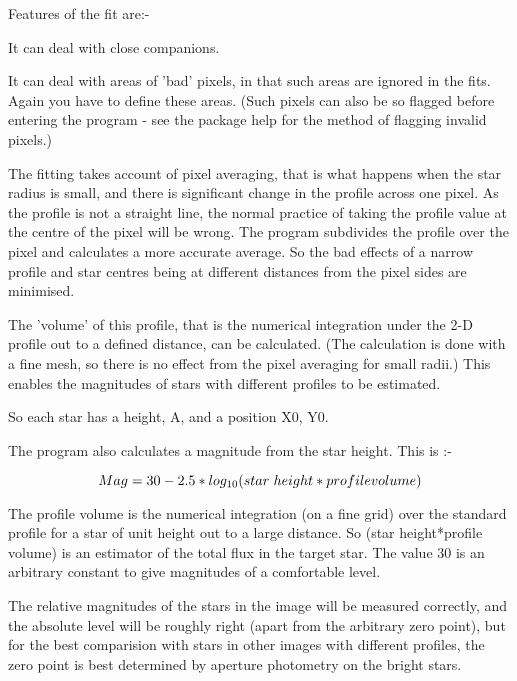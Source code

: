\begin{small}
{{ Features of the fit are:-

\begin{list}{{-}}{}
\item It can deal with close companions.
\item It can deal with areas of 'bad' pixels, in that such areas are
     ignored in the fits. Again you have to define these areas. (Such
     pixels can also be so flagged before entering the program - see
     the \starman package help for the method of flagging invalid
     pixels.)
\end{list}

  The fitting takes account of pixel averaging, that is what happens
  when the star radius is small, and there is significant change in
  the profile across one pixel. As the profile is not a straight line,
  the normal practice of taking the profile value at the centre of the
  pixel will be wrong. The program subdivides the profile over the
  pixel and calculates a more accurate average. So the bad effects of
  a narrow profile and star centres being at different distances from
  the pixel sides are minimised.

  The 'volume' of this profile, that is the numerical integration under
  the 2-D profile out to a defined distance, can be calculated. (The
  calculation is done with a fine mesh, so there is no effect from the
  pixel averaging for small radii.) This enables the magnitudes of
  stars with different profiles to be estimated.


   So each star has a height, A, and a position X0, Y0.


   The program also calculates a magnitude from the star height. This
   is :-

$$   Mag  =  30  -  2.5*log_{10}(star{\hspace{0.3em}}height*profile volume) $$

   The profile volume is the numerical integration (on a fine grid)
   over the standard profile for a star of unit height out to a large
   distance. So (star height*profile volume) is an estimator of the
   total flux in the target star.
   The value 30 is an arbitrary constant to give magnitudes of a
   comfortable level.

   The relative magnitudes of the stars in the image will be measured
   correctly, and the absolute level will be roughly right (apart from
   the arbitrary zero point), but for the best comparision with stars
   in other images with different profiles, the zero point is best
   determined by aperture photometry on the bright stars.


}}
\end{small}
